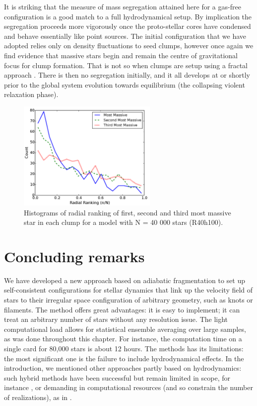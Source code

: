 It is striking that the measure of mass segregation attained here for a gas-free configuration is a good match to a full hydrodynamical setup. By implication the segregation proceeds more vigorously once the proto-stellar cores have condensed and behave essentially like point sources. The initial configuration that we have adopted relies only on density fluctuations to seed clumps, however once again we find evidence that massive stars begin and remain the centre of gravitational focus for clump formation. That is not so when clumps are setup using a fractal approach \citep{Goodwin2004,Allison2009}. There is then no segregation initially, and it all develops at or shortly prior to the global system evolution towards equilibrium (the collapsing violent relaxation phase). 


\begin{figure}
\begin{center}
\includegraphics[width=0.6\textwidth]{Figures/2_ClumpSeg}
\caption{Histograms of radial ranking of first, second and third most massive star in each clump for a model with N = 40 000 stars (R40h100).}
\label{Fig:2_ClumpSeg}
\end{center}
\end{figure}







\section{Concluding remarks}


We have developed a new approach based on adiabatic fragmentation to set up self-consistent configurations for stellar dynamics that link up the velocity field of stars to their irregular space configuration of arbitrary geometry, such as knots or filaments. The method offers great advantages: it is easy to implement; it can treat an arbitrary number of stars without any resolution issue. The light computational load allows for statistical ensemble averaging over large samples, as was done throughout this chapter. For instance, the computation time on a single card for 80,000 stars is about 12 hours. The methods has its limitations: the most significant one is the failure to include hydrodynamical effects. In the introduction, we mentioned other approaches partly based on hydrodynamics: such hybrid methods have been successful but remain limited in scope, for instance \cite{Moeckel2012}, or demanding in computational resources (and so constrain the number of realizations), as in \cite{Fujii2016}. 

